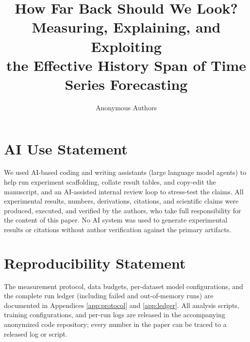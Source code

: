\documentclass{article}
\title{How Far Back Should We Look? Measuring, Explaining, and Exploiting\\ the Effective History Span of Time Series Forecasting}
\author{Anonymous Authors}
\begin{document}
\maketitle


















\section*{AI Use Statement}
We used AI-based coding and writing assistants (large language model agents) to help run experiment scaffolding, collate result tables, and copy-edit the manuscript, and an AI-assisted internal review loop to stress-test the claims. All experimental results, numbers, derivations, citations, and scientific claims were produced, executed, and verified by the authors, who take full responsibility for the content of this paper. No AI system was used to generate experimental results or citations without author verification against the primary artifacts.

\section*{Reproducibility Statement}
The measurement protocol, data budgets, per-dataset model configurations, and the complete run ledger (including failed and out-of-memory runs) are documented in Appendices \ref{app:protocol} and \ref{app:ledger}. All analysis scripts, training configurations, and per-run logs are released in the accompanying anonymized code repository; every number in the paper can be traced to a released log or script.

\appendix













\end{document}

